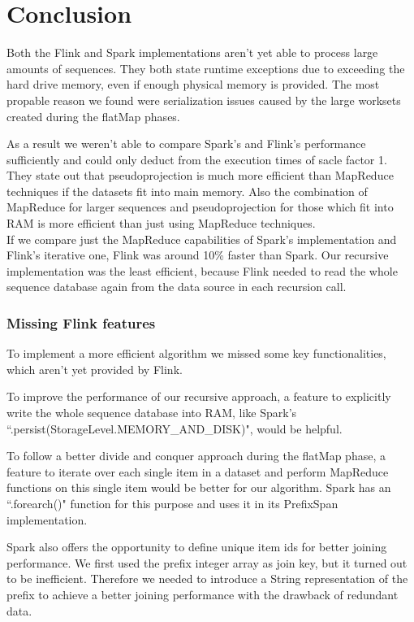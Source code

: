 \documentclass[a4paper,10pt,twocolumn]{article}
\begin{document}
\section{Conclusion}
Both the Flink and Spark implementations aren't yet able to process large amounts of sequences. They both state runtime exceptions due to exceeding the hard drive memory, even if enough physical memory is provided. The most propable reason we found were serialization issues caused by the large worksets created during the flatMap phases. 

As a result we weren't able to compare Spark's and Flink's performance sufficiently and could only deduct from the execution times of sacle factor 1. They state out that pseudoprojection is much more efficient than MapReduce techniques if the datasets fit into main memory. Also the combination of MapReduce for larger sequences and pseudoprojection for those which fit into RAM is more efficient than just using MapReduce techniques.\\
If we compare just the MapReduce capabilities of Spark's implementation and Flink's iterative one, Flink was around 10\% faster than Spark. Our recursive implementation was the least efficient, because Flink needed to read the whole sequence database again from the data source in each recursion call.

\subsubsection*{Missing Flink features}
To implement a more efficient algorithm we missed some key functionalities, which aren't yet provided by Flink.

To improve the performance of our recursive approach, a feature to explicitly write the whole sequence database into RAM, like Spark's ``.persist(StorageLevel.MEMORY\_AND\_DISK)", would be helpful.

To follow a better divide and conquer approach during the flatMap phase, a feature to iterate over each single item in a dataset and perform MapReduce functions on this single item would be better for our algorithm. Spark has an ``.forearch()" function for this purpose and uses it in its PrefixSpan implementation.

Spark also offers the opportunity to define unique item ids for better joining performance. We first used the prefix integer array as join key, but it turned out to be inefficient. Therefore we needed to introduce a String representation of the prefix to achieve a better joining performance with the drawback of redundant data.
\end{document}
